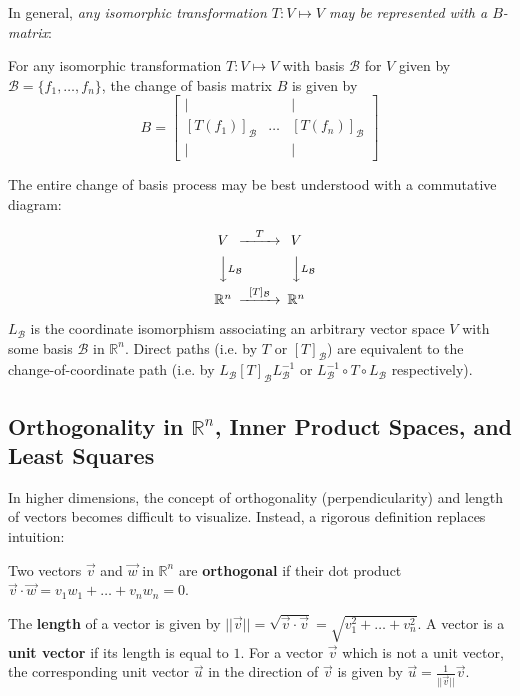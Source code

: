 In general, \textit{any isomorphic transformation $T:V\mapsto V$ may be represented with a $B$-matrix}:

\begin{shaded}
For any isomorphic transformation $T:V\mapsto V$ with basis $\mathcal{B}$ for $V$ given by $\mathcal{B}=\{f_1,\dots,f_n\}$, the change of basis matrix $B$ is given by \[B = \begin{bmatrix}
    | & & |\\
    [T(f_1)]_\mathcal{B} & \dots & [T(f_n)]_\mathcal{B}\\
    | & & |
\end{bmatrix}\]
\end{shaded}

The entire change of basis process may be best understood with a commutative diagram:

\[\begin{CD}
V @>T>> V\\
@VVL_\mathcal{B}V @VVL_\mathcal{B}V\\
\mathbb{R}^n @>[T]_\mathcal{B}>> \mathbb{R}^n
\end{CD}\]

$L_\mathcal{B}$ is the coordinate isomorphism associating an arbitrary vector space $V$ with some basis $\mathcal{B}$ in $\mathbb{R}^n$. Direct paths (i.e. by $T$ or $[T]_\mathcal{B}$) are equivalent to the change-of-coordinate path (i.e. by $L_\mathcal{B}[T]_\mathcal{B}L^{-1}_\mathcal{B}$ or $L_\mathcal{B}^{-1}\circ T\circ L_\mathcal{B}$ respectively). 

\subsection{Orthogonality in \texorpdfstring{$\mathbb{R}^n$}{R\^n}, Inner Product Spaces, and Least Squares}

In higher dimensions, the concept of orthogonality (perpendicularity) and length of vectors becomes difficult to visualize. Instead, a rigorous definition replaces intuition:

Two vectors $\vec{v}$ and $\vec{w}$ in $\mathbb{R}^n$ are \textbf{orthogonal} if their dot product $\vec{v}\cdot\vec{w} = v_1w_1 + \dots + v_nw_n = 0$.

The \textbf{length} of a vector is given by $||\vec{v}|| = \sqrt{\vec{v}\cdot \vec{v}} = \sqrt{v_1^2 + \dots + v_n^2}$. A vector is a \textbf{unit vector} if its length is equal to $1$. For a vector $\vec{v}$ which is not a unit vector, the corresponding unit vector $\vec{u}$ in the direction of $\vec{v}$ is given by $\vec{u} = \frac{1}{||\vec{v}||} \vec{v}$. 



